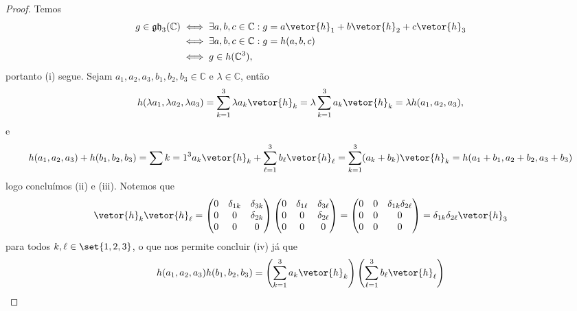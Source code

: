 \begin{proof}
    Temos
    \begin{align*}
        g \in \mathfrak{gh}_3(\mathbb{C}) &\iff \exists a,b,c \in \mathbb{C}: g = a\vetor{h}_1 + b\vetor{h}_2 + c \vetor{h}_3  \\
                                        &\iff \exists a,b,c \in \mathbb{C} : g = h(a,b,c)\\
                                        &\iff g \in h(\mathbb{C}^3),
    \end{align*}
    portanto (i) segue. Sejam \(a_1,a_2,a_3,b_1,b_2,b_3 \in \mathbb{C}\) e \(\lambda \in \mathbb{C}\), então
    \begin{equation*}
        h(\lambda a_1, \lambda a_2, \lambda a_3) = \sum_{k=1}^3 \lambda a_k \vetor{h}_k = \lambda \sum_{k = 1}^3 a_k \vetor{h}_k = \lambda h(a_1, a_2, a_3),
    \end{equation*}
    e
    \begin{equation*}
        h(a_1, a_2, a_3) + h(b_1,b_2,b_3) = \sum{k = 1}^3 a_k \vetor{h}_k + \sum_{\ell = 1}^3 b_\ell \vetor{h}_\ell = \sum_{k = 1}^3 (a_k + b_k)\vetor{h}_k = h(a_1 + b_1, a_2 + b_2, a_3 + b_3)
    \end{equation*}
    logo concluímos (ii) e (iii). Notemos que
    \begin{equation*}
        \vetor{h}_k \vetor{h}_\ell = \begin{pmatrix}
            0 & \delta_{1k} & \delta_{3k}\\
            0 & 0 & \delta_{2k}\\
            0 & 0 & 0
        \end{pmatrix}
        \begin{pmatrix}
            0 & \delta_{1\ell} & \delta_{3\ell}\\
            0 & 0 & \delta_{2 \ell}\\
            0 & 0 & 0
        \end{pmatrix} =
        \begin{pmatrix}
            0 & 0 & \delta_{1k} \delta_{2\ell}\\
            0 & 0 & 0\\
            0 & 0 & 0
        \end{pmatrix} = \delta_{1k} \delta_{2\ell} \vetor{h}_3
    \end{equation*}
    para todos \(k, \ell \in \set{1,2,3}\), o que nos permite concluir (iv) já que
    \begin{align*}
        h(a_1,a_2,a_3) h(b_1,b_2,b_3) &= \left(\sum_{k = 1}^3 a_k \vetor{h}_k\right)\left(\sum_{\ell = 1}^3 b_\ell \vetor{h}_\ell\right)\\

\end{align*}
\end{proof}
